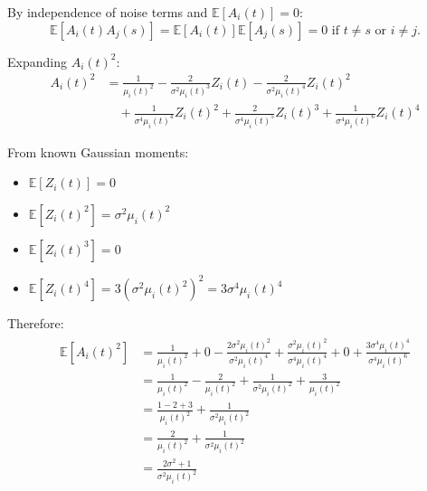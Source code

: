 By independence of noise terms and $\mathbb{E}[A_i(t)] = 0$:
\begin{equation}\label{eq:ind ait}
\mathbb{E}[A_i(t) A_j(s)] = \mathbb{E}[A_i(t)]\mathbb{E}[A_j(s)] = 0 \text{ if } t\neq s \text{ or } i\neq j.
\end{equation}

Expanding $A_i(t)^2$:
\begin{align*}
A_i(t)^2 &= \frac{1}{\mu_i(t)^2} - \frac{2}{\sigma^2\mu_i(t)^3}Z_i(t) - \frac{2}{\sigma^2\mu_i(t)^4}Z_i(t)^2 \\
&\quad + \frac{1}{\sigma^4\mu_i(t)^4}Z_i(t)^2 + \frac{2}{\sigma^4\mu_i(t)^5}Z_i(t)^3 + \frac{1}{\sigma^4\mu_i(t)^6}Z_i(t)^4
\end{align*}

From known Gaussian moments:
\begin{itemize}
\item $\mathbb{E}[Z_i(t)] = 0$
\item $\mathbb{E}[Z_i(t)^2] = \sigma^2\mu_i(t)^2$
\item $\mathbb{E}[Z_i(t)^3] = 0$ 
\item $\mathbb{E}[Z_i(t)^4] = 3(\sigma^2\mu_i(t)^2)^2 = 3\sigma^4\mu_i(t)^4$
\end{itemize}

Therefore:
\begin{align}\label{eq:var ait}
  \begin{split}
    \mathbb{E}[A_i(t)^2] &= \frac{1}{\mu_i(t)^2} + 0 -
    \frac{2\sigma^2\mu_i(t)^2}{\sigma^2\mu_i(t)^4} +
    \frac{\sigma^2\mu_i(t)^2}{\sigma^4\mu_i(t)^4} + 0 +
    \frac{3\sigma^4\mu_i(t)^4}{\sigma^4\mu_i(t)^6} \\
    &= \frac{1}{\mu_i(t)^2} - \frac{2}{\mu_i(t)^2} +
    \frac{1}{\sigma^2\mu_i(t)^2} + \frac{3}{\mu_i(t)^2} \\
    &= \frac{1 - 2 + 3}{\mu_i(t)^2} + \frac{1}{\sigma^2\mu_i(t)^2} \\
    &= \frac{2}{\mu_i(t)^2} + \frac{1}{\sigma^2\mu_i(t)^2} \\
    &= \frac{2\sigma^2 + 1}{\sigma^2\mu_i(t)^2}
  \end{split}
\end{align}




